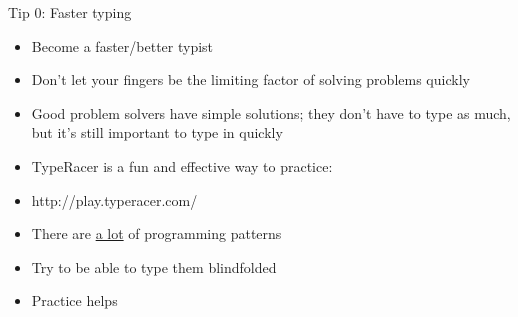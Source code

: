 \documentclass[12pt,t]{beamer}
\newcommand{\bi}{\begin{itemize}}
\newcommand{\ei}{\end{itemize}}
\begin{document}
\begin{frame}{Tip 0: Faster typing}
    \bi
        \item Become a faster/better typist
        \item Don't let your fingers be the limiting factor of solving problems quickly
        \item Good problem solvers have simple solutions; they don't have to type as much, but it's still important to type in quickly
        \vspace{20pt}
        \item TypeRacer is a fun and effective way to practice:
        \item http://play.typeracer.com/
        \vspace{20pt}
        \item There are \underline{a lot} of programming patterns
        \item Try to be able to type them blindfolded
        \item Practice helps
    \ei
\end{frame}
\end{document}
